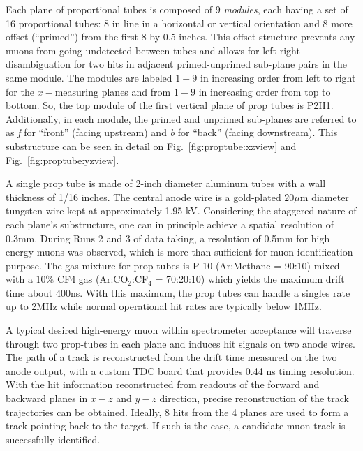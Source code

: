 Each plane of proportional tubes is composed of 9 \emph{modules}, each having a set of 16 proportional tubes: 8 in line in a horizontal or vertical orientation and 8 more offset (``primed'') from the first 8 by 0.5 inches. This offset structure prevents any muons from going undetected between tubes and allows for left-right disambiguation for two hits in adjacent primed-unprimed sub-plane pairs in the same module. The modules are labeled $1-9$ in increasing order from left to right for the $x-$measuring planes and from $1-9$ in increasing order from top to bottom. So, the top module of the first vertical plane of prop tubes is P2H1. Additionally, in each module, the primed and unprimed sub-planes are referred to as \emph{f} for ``front'' (facing upstream) and \emph{b} for ``back'' (facing downstream). This substructure can be seen in detail on Fig.~\ref{fig:proptube:xzview} and Fig.~\ref{fig:proptube:yzview}.

A single prop tube is made of 2-inch diameter aluminum tubes with a wall thickness of 1/16 inches. The central anode wire is a gold-plated $20 \mu$m diameter tungsten wire kept at approximately 1.95 kV. Considering the staggered nature of each plane's substructure, one can in principle achieve a spatial resolution of 0.3mm.  During Runs 2 and 3 of data taking, a resolution of 0.5mm for high energy muons was observed, which is more than sufficient for muon identification purpose. The gas mixture for prop-tubes is P-10 (Ar:Methane = 90:10) mixed with a $10\%$ CF4 gas (Ar:CO$_2$:CF$_4$ = 70:20:10) which yields the maximum drift time about 400ns. With this maximum, the prop tubes can handle a singles rate up to 2MHz while normal operational hit rates are typically below 1MHz.

A typical desired high-energy muon within spectrometer acceptance will traverse through two prop-tubes in each plane and induces hit signals on two anode wires. The path of a track is reconstructed from the drift time measured on the two anode output, with a custom TDC board that provides 0.44 ns timing resolution. With the hit information reconstructed from readouts of the forward and backward planes in $x-z$ and $y-z$ direction, precise reconstruction of the track trajectories can be obtained. Ideally, 8 hits from the 4 planes are used to form a track pointing back to the target. If such is the case, a candidate muon track is successfully identified.

